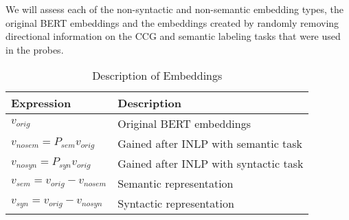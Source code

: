 \documentclass[11pt,a4paper]{article}
\begin{document}
We will assess each of the non-syntactic and non-semantic embedding types, the original BERT embeddings and the embeddings created by randomly removing directional information on the CCG and semantic labeling tasks that were used in the probes. 



\begin{table}[ht]
    \centering
    \begin{tabular}{p{4cm}p{3cm}}\hline
        \textbf{Expression} & \textbf{Description}\\ \hline 
        $v_{orig}$ & Original BERT embeddings  \\
        $v_{nosem} = P_{sem} v_{orig}$ & Gained after INLP with semantic task \\
        $v_{nosyn}= P_{syn} v_{orig}$ & Gained after INLP with syntactic task \\
        $v_{sem} = v_{orig}-v_{nosem}$ & Semantic representation \\
        $v_{syn} = v_{orig}-v_{nosyn}$ & Syntactic representation \\

        
        
        \hline
    \end{tabular}
    \caption{\label{description} Description of Embeddings
    }
\end{table}
\end{document}
